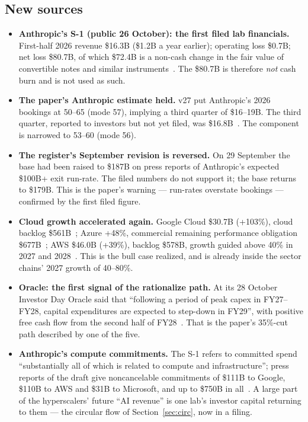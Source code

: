 \documentclass[11pt,letterpaper]{article}
\begin{document}
\subsection*{New sources}\label{ag:sources}
\begin{itemize}
\item \textbf{Anthropic's S-1 (public 26 October): the first filed lab financials.} First-half 2026 revenue \$16.3B (\$1.2B a year earlier); operating loss \$0.7B; net loss \$80.7B, of which \$72.4B is a non-cash change in the fair value of convertible notes and similar instruments~\cite{ref:anthropic_s1}. The \$80.7B is therefore \emph{not} cash burn and is not used as such.
\item \textbf{The paper's Anthropic estimate held.} v27 put Anthropic's 2026 bookings at 50--65 (mode 57), implying a third quarter of \$16--19B. The third quarter, reported to investors but not yet filed, was \$16.8B~\cite{ref:cnbc_anthropic_q3}. The component is narrowed to 53--60 (mode 56).
\item \textbf{The register's September revision is reversed.} On 29 September the base had been raised to \$187B on press reports of Anthropic's expected \$100B+ exit run-rate. The filed numbers do not support it; the base returns to \$179B. This is the paper's warning --- run-rates overstate bookings --- confirmed by the first filed figure.
\item \textbf{Cloud growth accelerated again.} Google Cloud \$30.7B (+103\%), cloud backlog \$561B~\cite{ref:alphabet_q3_2026}; Azure +48\%, commercial remaining performance obligation \$677B~\cite{ref:msft_q1fy27}; AWS \$46.0B (+39\%), backlog \$578B, growth guided above 40\% in 2027 and 2028~\cite{ref:amzn_q3_2026}. This is the bull case realized, and is already inside the sector chains' 2027 growth of 40--80\%.
\item \textbf{Oracle: the first signal of the rationalize path.} At its 28 October Investor Day Oracle said that ``following a period of peak capex in FY27--FY28, capital expenditures are expected to step-down in FY29'', with positive free cash flow from the second half of FY28~\cite{ref:orcl_investor_day}. That is the paper's 35\%-cut path described by one of the five.
\item \textbf{Anthropic's compute commitments.} The S-1 refers to committed spend ``substantially all of which is related to compute and infrastructure''; press reports of the draft give noncancelable commitments of \$111B to Google, \$110B to AWS and \$31B to Microsoft, and up to \$750B in all~\cite{ref:anthropic_s1,ref:dealroom_s1}. A large part of the hyperscalers' future ``AI revenue'' is one lab's investor capital returning to them --- the circular flow of Section~\ref{sec:circ}, now in a filing.
\end{itemize}
\end{document}

